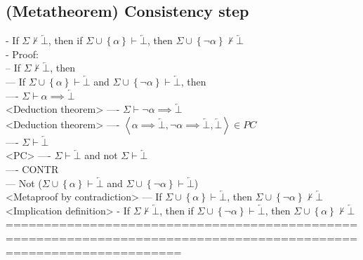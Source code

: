 \documentclass{book}
\newcommand{\inot}{\not}
\newcommand{\contr}{\overleftarrow{\bot}}
\newcommand{\set}[1]{\left\{ #1 \right\}}
\newcommand{\seq}[1]{\left\langle #1 \right\rangle}
\begin{document}
\subsection{(Metatheorem) Consistency step} %
	- If $\Sigma \inot \vdash \contr$, then if $\Sigma \cup \set{\alpha} \vdash \contr$, then $\Sigma \cup \set{\lnot \alpha} \inot \vdash \contr$ \\
	- Proof: \\
		-- If $\Sigma \inot \vdash \contr$, then \\
			--- If $\Sigma \cup \set{\alpha} \vdash \contr$ and $\Sigma \cup \set{\lnot \alpha} \vdash \contr$, then \\
				---- $\Sigma \vdash \alpha \implies \contr$ \\ <Deduction theorem>
				---- $\Sigma \vdash \lnot \alpha \implies \contr$ \\  <Deduction theorem>
				---- $\seq{\alpha \implies \contr, \lnot \alpha \implies \contr, \contr} \in PC$ \\
				---- $\Sigma \vdash \contr$ \\ <PC>
				---- $\Sigma \vdash \contr$ and not $\Sigma \vdash \contr$ \\
				---- CONTR \\
			--- Not ($\Sigma \cup \set{\alpha} \vdash \contr$ and $\Sigma \cup \set{\lnot \alpha} \vdash \contr$) \\ <Metaproof by contradiction>
			--- If $\Sigma \cup \set{\alpha} \vdash \contr$, then $\Sigma \cup \set{\lnot \alpha} \inot \vdash \contr$ \\ <Implication definition>
	- If $\Sigma \inot \vdash \contr$, then if $\Sigma \cup \set{\lnot \alpha} \vdash \contr$, then $\Sigma \cup \set{\alpha} \inot \vdash \contr$ \\
	===================================================================================================================
\end{document}
